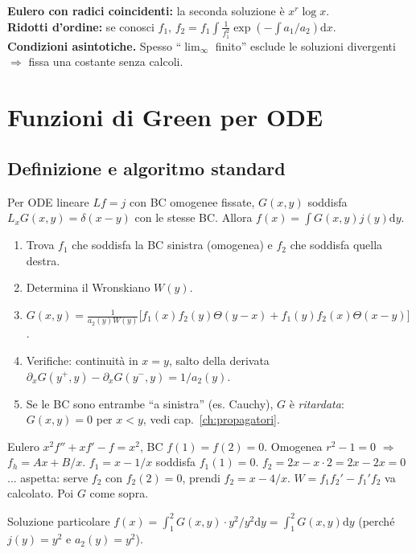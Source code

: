 \documentclass[11pt,a4paper,openany]{book}
\theoremstyle{definition}
\newcommand{\dd}{\mathrm{d}}
\begin{document}
\begin{trucco}
\textbf{Eulero con radici coincidenti:} la seconda soluzione \`e $x^r\log x$.\\
\textbf{Ridotti d'ordine:} se conosci $f_1$, $f_2=f_1\int\frac{1}{f_1^2}\exp(-\int a_1/a_2)\dd x$.\\
\textbf{Condizioni asintotiche.} Spesso ``$\lim_\infty$ finito'' esclude le soluzioni divergenti $\Rightarrow$ fissa una costante senza calcoli.
\end{trucco}

\chapter{Funzioni di Green per ODE}

\section{Definizione e algoritmo standard}

\begin{teoria}
Per ODE lineare $L f=j$ con BC omogenee fissate, $G(x,y)$ soddisfa $L_x G(x,y)=\delta(x-y)$ con le stesse BC. Allora $f(x)=\int G(x,y)j(y)\dd y$.
\end{teoria}

\begin{algoritmo}
\begin{enumerate}
\item Trova $f_1$ che soddisfa la BC sinistra (omogenea) e $f_2$ che soddisfa quella destra.
\item Determina il Wronskiano $W(y)$.
\item $G(x,y)=\frac{1}{a_2(y)W(y)}\big[f_1(x)f_2(y)\Theta(y-x)+f_1(y)f_2(x)\Theta(x-y)\big]$.
\item Verifiche: continuit\`a in $x=y$, salto della derivata $\partial_x G(y^+,y)-\partial_x G(y^-,y)=1/a_2(y)$.
\item Se le BC sono entrambe ``a sinistra'' (es. Cauchy), $G$ \`e \emph{ritardata}: $G(x,y)=0$ per $x<y$, vedi cap.~\ref{ch:propagatori}.
\end{enumerate}
\end{algoritmo}

\begin{esempio}[Scritto 20/06/2023, Es. 4]
Eulero $x^2 f''+xf'-f=x^2$, BC $f(1)=f(2)=0$. Omogenea $r^2-1=0$ $\Rightarrow$ $f_h=Ax+B/x$. $f_1=x-1/x$ soddisfa $f_1(1)=0$. $f_2=2x-x\cdot 2=2x-2x=0$... aspetta: serve $f_2$ con $f_2(2)=0$, prendi $f_2=x-4/x$. $W=f_1f_2'-f_1'f_2$ va calcolato. Poi $G$ come sopra.

Soluzione particolare $f(x)=\int_1^2 G(x,y)\cdot y^2/y^2\dd y=\int_1^2 G(x,y)\dd y$ (perch\'e $j(y)=y^2$ e $a_2(y)=y^2$).
\end{esempio}
\end{document}

